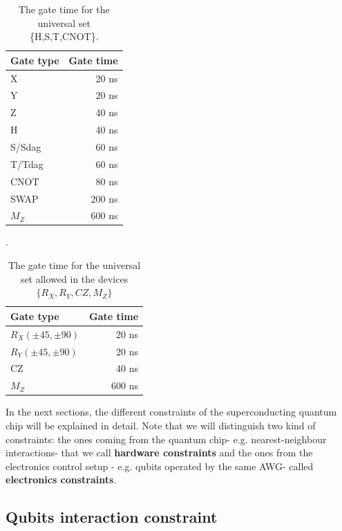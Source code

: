 \begin{table}[bth!]
\centering
\caption{The gate time for the universal set \{H,S,T,CNOT\}.} 
\label{uni_set_gatetime}
\begin{tabular}{lr}
\hline
Gate type & Gate time \\ \hline
X         & 20 ns     \\ 
Y         & 20 ns     \\ 
Z         & 40 ns     \\ 
H         & 40 ns     \\ 
S/Sdag    & 60 ns          \\ 
T/Tdag    & 60 ns          \\ 
CNOT      & 80 ns     \\ 
SWAP      & 200 ns    \\ 
$M_{Z}$         &  600 ns          \\ \hline
\end{tabular}
\end{table}

\begin{table}[bth!]
\centering
\caption{The gate time for the universal set allowed in the devices $\{R_{X},R_{Y},CZ,M_{Z}\}$}.
\label{sc_set_gatetime}
\begin{tabular}{lr}
\hline
Gate type & Gate time \\ \hline
$R_{X}(\pm 45, \pm90)$         & 20 ns     \\ 
$R_{Y}(\pm 45, \pm90)$       & 20 ns     \\ 
CZ        & 40 ns     \\ 
$M_{Z}$         &  600 ns          \\ \hline
\end{tabular}
\end{table}

In the next sections, the different constraints of the superconducting quantum chip will be explained in detail. Note that we will distinguish two kind of constraints: the ones coming from the quantum chip- e.g. nearest-neighbour interactions- that we call \textbf{hardware constraints} and the ones from the electronics control setup - e.g. qubits operated by the same AWG- called \textbf{electronics constraints}.






\subsection{Qubits interaction constraint}
\label{sec:org77a3a48}

